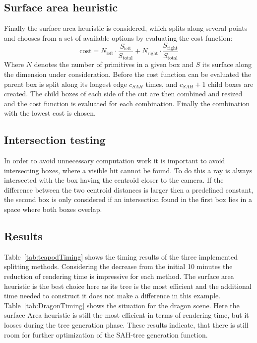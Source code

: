 \subsection{Surface area heuristic}
Finally the surface area heuristic is considered, which splits along several points and chooses from a set of available options by evaluating the cost function:
\begin{equation}
\text{cost} = N_{\text{left}} \cdot \frac{S_{\text{left}}}{S_{\text{total}}} +
              N_{\text{right}} \cdot \frac{S_{\text{right}}}{S_{\text{total}}}
\end{equation}
Where $N$ denotes the number of primitives in a given box and $S$ its surface along the dimension under consideration. Before the cost function can be evaluated the parent box is split along its longest edge $c_{SAH}$ times, and $c_{SAH} + 1$ child boxes are created. The child boxes of each side of the cut are then combined and resized and the cost function is evaluated for each combination. Finally the combination with the lowest cost is chosen. 

\subsection{Intersection testing}
In order to avoid unnecessary computation work it is important to avoid intersecting boxes, where a visible hit cannot be found. To do this a ray is always intersected with the box having the centroid closer to the camera. If the difference between the two centroid distances is larger then a predefined constant, the second box is only considered if an intersection found in the first box lies in a space where both boxes overlap. 

\subsection{Results}
Table~\ref{tab:teapodTiming} shows the timing results of the three implemented splitting methods. Considering the decrease from the initial 10 minutes the reduction of rendering time is impressive for each method. The surface area heuristic is the best choice here as its tree is the most efficient and the additional time needed to construct it does not make a difference in this example. Table~\ref{tab:DragonTiming} shows the situation for the dragon scene. Here the surface Area heuristic is still the most efficient in terms of rendering time, but it looses during the tree generation phase. These results indicate, that there is still room for further optimization of the SAH-tree generation function.  

